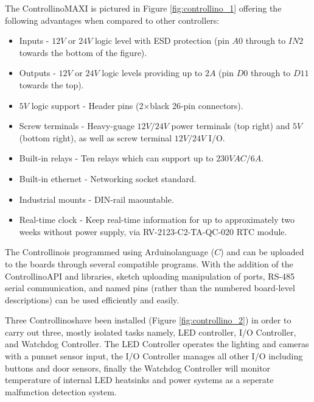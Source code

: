\documentclass[fleqn,twoside]{article}
\begin{document}
The Controllino\texttrademark MAXI is pictured in Figure \ref{fig:controllino_1} offering the following advantages when compared to other controllers:


\begin{itemize}
	\item Inputs - $12V$ or $24V$ logic level with ESD protection (pin $A0$ through to $IN2$ towards the bottom of the figure). 
	\item Outputs - $12V$ or $24V$ logic levels providing up to $2A$ (pin $D0$ through to $D11$ towards the top).
	\item $5V$ logic support - Header pins (2$\times$black 26-pin connectors). 
	\item Screw terminals - Heavy-guage $12V/24V$ power terminals (top right) and $5V$ (bottom right), as well as screw terminal $12V/24V$ I/O. 
	\item Built-in relays - Ten relays which can support up to $230VAC/6A$.
	\item Built-in ethernet - Networking socket standard.
	\item Industrial mounts - DIN-rail maountable. 
	\item Real-time clock - Keep real-time information for up to approximately two weeks without power supply, via RV-2123-C2-TA-QC-020 RTC module.
\end{itemize}

The Controllino\texttrademark is programmed using Arduino\texttrademark language ($C$) and can be uploaded to the boards through several compatible programs. With the addition of the Controllino\texttrademark API and libraries, sketch uploading manipulation of ports, RS-485 serial communication, and named pins (rather than the numbered board-level descriptions) can be used efficiently and easily.

Three Controllinos\texttrademark have been installed (Figure \ref{fig:controllino_2}) in order to carry out three, mostly isolated tasks namely, LED controller, I/O Controller, and Watchdog Controller. The LED Controller operates the lighting and cameras with a punnet sensor input, the I/O Controller manages all other I/O including buttons and door sensors, finally the Watchdog Controller will monitor temperature of internal LED heatsinks and power systems as a seperate malfunction detection system.
\end{document}
